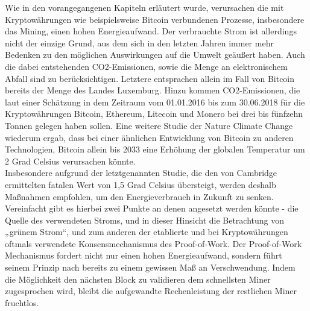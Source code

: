 Wie in den vorangegangenen Kapiteln erläutert wurde, verursachen die mit Kryptowährungen wie beispielsweise Bitcoin verbundenen Prozesse, insbesondere das Mining, einen hohen Energieaufwand. Der verbrauchte Strom ist allerdings nicht der einzige Grund, aus dem sich in den letzten Jahren immer mehr Bedenken zu den möglichen Auswirkungen auf die Umwelt geäußert haben. Auch die dabei entstehenden CO2-Emissionen, sowie die Menge an elektronischem Abfall sind zu berücksichtigen. Letztere entsprachen allein im Fall von Bitcoin bereits der Menge des Landes Luxemburg. Hinzu kommen CO2-Emissionen, die laut einer Schätzung in dem Zeitraum vom 01.01.2016 bis zum 30.06.2018 für die Kryptowährungen Bitcoin, Ethereum, Litecoin und Monero bei drei bis fünfzehn Tonnen gelegen haben sollen. Eine weitere Studie der Nature Climate Change wiederum ergab, dass bei einer ähnlichen Entwicklung von Bitcoin zu anderen Technologien, Bitcoin allein bis 2033 eine Erhöhung der globalen Temperatur um 2 Grad Celsius verursachen könnte.\\
Insbesondere aufgrund der letztgenannten Studie, die den von Cambridge ermittelten fatalen Wert von 1,5 Grad Celsius übersteigt, werden deshalb Maßnahmen empfohlen, um den Energieverbrauch in Zukunft zu senken. Vereinfacht gibt es hierbei zwei Punkte an denen angesetzt werden könnte - die Quelle des verwendeten Stroms, und in dieser Hinsicht die Betrachtung von „grünem Strom“, und zum anderen der etablierte und bei Kryptowährungen oftmals verwendete Konsensmechanismus des Proof-of-Work. Der Proof-of-Work Mechanismus fordert nicht nur einen hohen Energieaufwand, sondern führt seinem Prinzip nach bereits zu einem gewissen Maß an Verschwendung. Indem die Möglichkeit den nächsten Block zu validieren dem schnellsten Miner zugesprochen wird, bleibt die aufgewandte Rechenleistung der restlichen Miner fruchtlos.